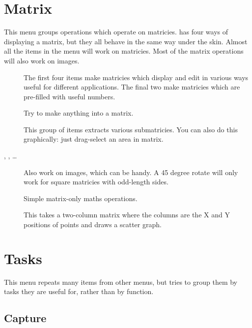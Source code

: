 \section{Matrix}

This menu groups operations which operate on matricies. \nip{} has four ways
of displaying a matrix, but they all behave in the same way under the skin.
Almost all the items in the  menu will work on matricies. Most of the
matrix operations will also work on images.

\begin{description}

\item[]
	The first four items make matricies which display and edit in various 
	ways useful for different applications. The final two make matricies
	which are pre-filled with useful numbers.

\item[]
	Try to make anything into a matrix.

\item[]
	This group of items extracts various submatricies. You can also do
	this graphically: just drag-select an area in matrix.

\item[, , \ldots]
	Also work on images, which can be handy.
	A 45 degree rotate will only work for square matricies with
	odd-length sides.

\item[]
	Simple matrix-only maths operations.

\item[]
	This takes a two-column matrix where the columns are the X and Y
	positions of points and draws a scatter graph.

\end{description}

\section{Tasks}

This menu repeats many items from other menus, but tries to group them by
tasks they are useful for, rather than by function.

\subsection{Capture}

